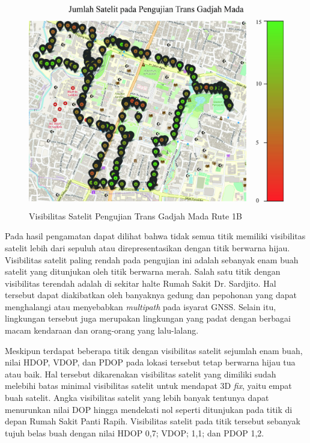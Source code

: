 \begin{figure}[H]
	\centering
	\includegraphics[width=12cm]{contents/chapter-4/pengujian-bergerak/moving-SATS.jpg}
	\caption{Visibilitas Satelit Pengujian Trans Gadjah Mada Rute 1B}
	\label{Fig: moving-sats}
\end{figure}

Pada hasil pengamatan dapat dilihat bahwa tidak semua titik memiliki visibilitas satelit lebih dari sepuluh atau direpresentasikan dengan titik berwarna hijau. Visibilitas satelit paling rendah pada pengujian ini adalah sebanyak enam buah satelit yang ditunjukan oleh titik berwarna merah. Salah satu titik dengan visibilitas terendah adalah di sekitar halte Rumah Sakit Dr. Sardjito. Hal tersebut dapat diakibatkan oleh banyaknya gedung dan pepohonan yang dapat menghalangi atau menyebabkan \textit{multipath} pada isyarat GNSS. Selain itu, lingkungan tersebut juga merupakan lingkungan yang padat dengan berbagai macam kendaraan dan orang-orang yang lalu-lalang.

Meskipun terdapat beberapa titik dengan visibilitas satelit sejumlah enam buah, nilai HDOP, VDOP, dan PDOP pada lokasi tersebut tetap berwarna hijau tua atau baik. Hal tersebut dikarenakan visibilitas satelit yang dimiliki sudah melebihi batas minimal visibilitas satelit untuk mendapat 3D \textit{fix}, yaitu empat buah satelit. Angka visibilitas satelit yang lebih banyak tentunya dapat menurunkan nilai DOP hingga mendekati nol seperti ditunjukan pada titik di depan Rumah Sakit Panti Rapih. Visibilitas satelit pada titik tersebut sebanyak tujuh belas buah dengan nilai HDOP 0,7; VDOP; 1,1; dan PDOP 1,2.